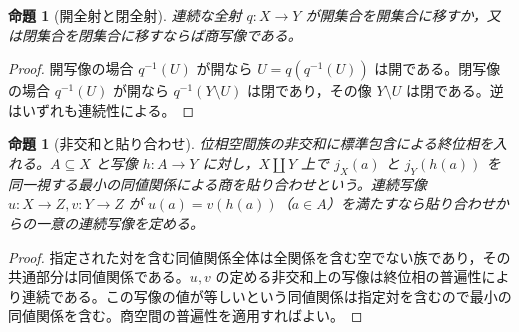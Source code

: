 \documentclass[a5paper,10pt,dvipdfmx]{jsarticle}
\theoremstyle{definition}
\theoremstyle{plain}
\newtheorem{prop}[ruledef]{命題}
\begin{document}
\begin{prop}[開全射と閉全射]\label{k261}
連続な全射 $q\colon X\to Y$ が開集合を開集合に移すか，又は閉集合を閉集合に移すならば商写像である。
\end{prop}
\begin{proof}
開写像の場合 $q^{-1}(U)$ が開なら $U=q(q^{-1}(U))$ は開である。閉写像の場合 $q^{-1}(U)$ が開なら $q^{-1}(Y\setminus U)$ は閉であり，その像 $Y\setminus U$ は閉である。逆はいずれも連続性による。
\end{proof}
\begin{prop}[非交和と貼り合わせ]\label{k262}
位相空間族の非交和に標準包含による終位相を入れる。$A\subseteq X$ と写像 $h\colon A\to Y$ に対し，$X\amalg Y$ 上で $j_X(a)$ と $j_Y(h(a))$ を同一視する最小の同値関係による商を貼り合わせという。連続写像 $u\colon X\to Z,v\colon Y\to Z$ が $u(a)=v(h(a))$（$a\in A$）を満たすなら貼り合わせからの一意の連続写像を定める。
\end{prop}
\begin{proof}
指定された対を含む同値関係全体は全関係を含む空でない族であり，その共通部分は同値関係である。$u,v$ の定める非交和上の写像は終位相の普遍性により連続である。この写像の値が等しいという同値関係は指定対を含むので最小の同値関係を含む。商空間の普遍性を適用すればよい。
\end{proof}
\end{document}
